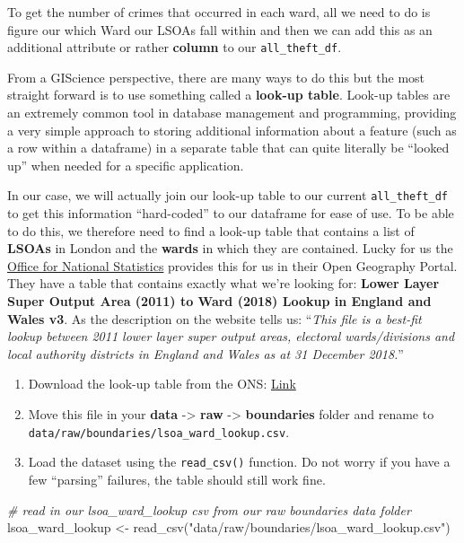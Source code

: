 \documentclass[
]{book}
\newenvironment{Shaded}{\begin{snugshade}}{\end{snugshade}}
\newcommand{\CommentTok}[1]{\textcolor[rgb]{0.56,0.35,0.01}{\textit{#1}}}
\newcommand{\FunctionTok}[1]{\textcolor[rgb]{0.00,0.00,0.00}{#1}}
\newcommand{\NormalTok}[1]{#1}
\newcommand{\OtherTok}[1]{\textcolor[rgb]{0.56,0.35,0.01}{#1}}
\newcommand{\StringTok}[1]{\textcolor[rgb]{0.31,0.60,0.02}{#1}}
\providecommand{\tightlist}{%
  \setlength{\itemsep}{0pt}\setlength{\parskip}{0pt}}
\begin{document}
To get the number of crimes that occurred in each ward, all we need to do is figure our which Ward our LSOAs fall within and then we can add this as an additional attribute or rather \textbf{column} to our \texttt{all\_theft\_df}.

From a GIScience perspective, there are many ways to do this but the most straight forward is to use something called a \textbf{look-up table}. Look-up tables are an extremely common tool in database management and programming, providing a very simple approach to storing additional information about a feature (such as a row within a dataframe) in a separate table that can quite literally be ``looked up'' when needed for a specific application.

In our case, we will actually join our look-up table to our current \texttt{all\_theft\_df} to get this information ``hard-coded'' to our dataframe for ease of use. To be able to do this, we therefore need to find a look-up table that contains a list of \textbf{LSOAs} in London and the \textbf{wards} in which they are contained. Lucky for us the \href{https://www.ons.gov.uk/}{Office for National Statistics} provides this for us in their Open Geography Portal. They have a table that contains exactly what we're looking for: \textbf{Lower Layer Super Output Area (2011) to Ward (2018) Lookup in England and Wales v3}. As the description on the website tells us: ``\emph{This file is a best-fit lookup between 2011 lower layer super output areas, electoral wards/divisions and local authority districts in England and Wales as at 31 December 2018.}''

\begin{enumerate}
\def\labelenumi{\arabic{enumi}.}
\tightlist
\item
  Download the look-up table from the ONS: \href{https://geoportal.statistics.gov.uk/datasets/8c05b84af48f4d25a2be35f1d984b883_0}{Link}
\item
  Move this file in your \textbf{data} -\textgreater{} \textbf{raw} -\textgreater{} \textbf{boundaries} folder and rename to \texttt{data/raw/boundaries/lsoa\_ward\_lookup.csv}.
\item
  Load the dataset using the \texttt{read\_csv()} function. Do not worry if you have a few ``parsing'' failures, the table should still work fine.
\end{enumerate}

\begin{Shaded}
\begin{Highlighting}[]
\CommentTok{\# read in our lsoa\_ward\_lookup csv from our raw boundaries data folder}
\NormalTok{lsoa\_ward\_lookup }\OtherTok{\textless{}{-}} \FunctionTok{read\_csv}\NormalTok{(}\StringTok{"data/raw/boundaries/lsoa\_ward\_lookup.csv"}\NormalTok{)}
\end{Highlighting}
\end{Shaded}
\end{document}
